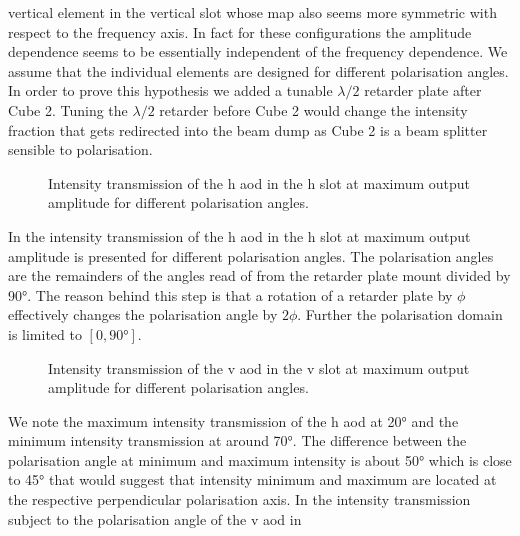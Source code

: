 vertical element in the vertical slot whose map also seems more symmetric with
respect to the frequency axis. In fact for these configurations the amplitude
dependence seems to be essentially independent of the frequency dependence.
We assume that the individual elements are designed for different
polarisation angles. In order to prove this hypothesis we added a tunable
$\lambda/2$ retarder plate after Cube \num{2}. Tuning the $\lambda/2$ retarder
before Cube \num{2} would change the intensity fraction that gets redirected into
the beam dump as Cube \num{2} is a beam splitter sensible to polarisation.
\begin{figure}[htb]
  \centering
  \begin{adjustbox}{width=\textwidth}
  \end{adjustbox}
  \caption{Intensity transmission of the \gls{h} \gls{aod} in the \gls{h} slot
    at maximum output amplitude for different polarisation angles.
  }\label{fig:intensity_polarisation_h}
\end{figure}
In  the intensity transmission of the
\gls{h} \gls{aod} in the \gls{h} slot at maximum output amplitude is presented
for different polarisation angles. The polarisation angles are the remainders
of the angles read of from the retarder plate mount divided by \ang{90}. The
reason behind this step is that a rotation of a retarder plate by $\phi$
effectively changes the polarisation angle by $2\phi$. Further the
polarisation domain is limited to $\left[0,\ang{90}\right]$.
\begin{figure}[htb]
  \centering
  \begin{adjustbox}{width=\textwidth}
  \end{adjustbox}
  \caption{Intensity transmission of the \gls{v} \gls{aod} in the \gls{v} slot
    at maximum output amplitude for different polarisation angles.
  }\label{fig:intensity_polarisation_v}
\end{figure}
We note the maximum intensity transmission of the \gls{h} \gls{aod} at
\ang{20} and the minimum intensity transmission at around \ang{70}. The
difference between the polarisation angle at minimum and maximum intensity
is about \ang{50} which is close to \ang{45} that would suggest that
intensity minimum and maximum are located at the respective perpendicular
polarisation axis. In  the intensity
transmission subject to the polarisation angle of the \gls{v} \gls{aod} in

